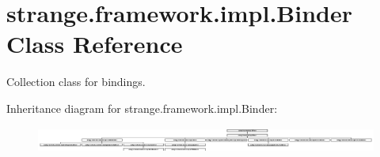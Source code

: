 \hypertarget{classstrange_1_1framework_1_1impl_1_1_binder}{\section{strange.\-framework.\-impl.\-Binder Class Reference}
\label{classstrange_1_1framework_1_1impl_1_1_binder}
}


Collection class for bindings.  


Inheritance diagram for strange.\-framework.\-impl.\-Binder\-:\begin{figure}[H]
\begin{center}
\leavevmode
\includegraphics[height=0.864198cm]{classstrange_1_1framework_1_1impl_1_1_binder}
\end{center}
\end{figure}
